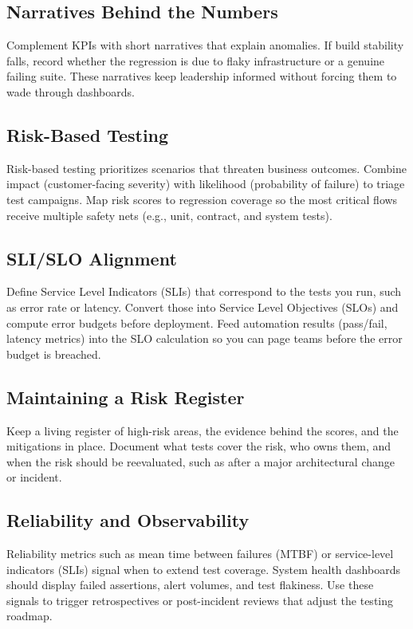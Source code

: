 \subsection{Narratives Behind the Numbers}

Complement KPIs with short narratives that explain anomalies. If build stability falls, record whether the regression is due to flaky infrastructure or a genuine failing suite. These narratives keep leadership informed without forcing them to wade through dashboards.

\subsection{Risk-Based Testing}

Risk-based testing prioritizes scenarios that threaten business outcomes. Combine impact (customer-facing severity) with likelihood (probability of failure) to triage test campaigns. Map risk scores to regression coverage so the most critical flows receive multiple safety nets (e.g., unit, contract, and system tests).

\subsection{SLI/SLO Alignment}

Define Service Level Indicators (SLIs) that correspond to the tests you run, such as error rate or latency. Convert those into Service Level Objectives (SLOs) and compute error budgets before deployment. Feed automation results (pass/fail, latency metrics) into the SLO calculation so you can page teams before the error budget is breached.

\subsection{Maintaining a Risk Register}

Keep a living register of high-risk areas, the evidence behind the scores, and the mitigations in place. Document what tests cover the risk, who owns them, and when the risk should be reevaluated, such as after a major architectural change or incident.

\subsection{Reliability and Observability}

Reliability metrics such as mean time between failures (MTBF) or service-level indicators (SLIs) signal when to extend test coverage. System health dashboards should display failed assertions, alert volumes, and test flakiness. Use these signals to trigger retrospectives or post-incident reviews that adjust the testing roadmap.

